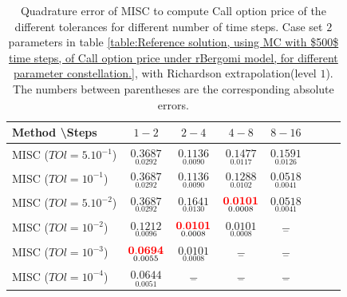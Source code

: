 \documentclass[11pt]{article}
\begin{document}
\begin{table}[h!]
	\centering
	\begin{tabular}{l*{6}{c}r}
		Method \textbackslash  Steps            & $1-2$ & $2-4$ & $4-8$ & $8-16$  \\
		\hline
		MISC ($TOl=5.10^{-1}$)  & $\underset{ 0.0292}{\mathbf{
				0.3687}}$ & $\underset{ 0.0090}{\mathbf{    0.1136}}$ & $\underset{    0.0117
			}{\mathbf{
				0.1477
			}}$ & $\underset{
		0.0126}{\mathbf{ 0.1591}}$ \\
		MISC ($TOl=10^{-1}$)  & $\underset{ 0.0292}{\mathbf{
				0.3687}}$ & $\underset{ 0.0090}{\mathbf{    0.1136}}$ & $\underset{  0.0102}{\mathbf{  0.1288
			}}$ & $\underset{0.0041}{\mathbf{0.0518
		}}$  \\
		MISC ($TOl=5.10^{-2}$)  & $\underset{ 0.0292}{\mathbf{
				0.3687}}$& $\underset{  0.0130}{\mathbf{
				0.1641
			}}$ & $\underset{0.0008}{\mathbf{{\color{red}0.0101}}}$ & $\underset{0.0041}{\mathbf{0.0518
		}}$  \\
		MISC ($TOl=10^{-2}$)  & $\underset{   0.0096
		}{\mathbf{    0.1212
		}}$ & $\underset{0.0008}{\mathbf{
		{\color{red}0.0101}}}$ & $\underset{0.0008 }{\mathbf{
			0.0101}}$ & $\underset{-}{\mathbf{ -}}$  \\
		MISC ($TOl=10^{-3}$)  & $\underset{     0.0055
		}{\mathbf{ {\color{red}    0.0694}
		}}$ & $\underset{0.0008}{\mathbf{
		0.0101}}$ & $\underset{-}{\mathbf{-}}$ & $\underset{-}{\mathbf{-}}$  \\
	
		MISC ($TOl=10^{-4}$)  & $\underset{  0.0051}{\mathbf{    0.0644		}}$ & $\underset{-}{\mathbf{-}}$ & $\underset{-}{\mathbf{-}}$ & $\underset{-}{\mathbf{-}}$  \\
	
		\hline
	\end{tabular}
	\caption{Quadrature error of MISC to compute Call option price of the different tolerances for different number of time steps. Case set $2$ parameters in table \ref{table:Reference solution, using MC with $500$ time steps, of Call option price under rBergomi model, for different parameter constellation.}, with Richardson extrapolation(level $1$). The numbers between parentheses are the corresponding absolute errors.}
	\label{Quadrature error of MISC to compute Call option price of the different tolerances for different number of time steps. Case set $2$ parameters, with Richardson extrapolation(level $1$). The numbers between parentheses are the corresponding absolute errors,linear}
\end{table}
\end{document}
